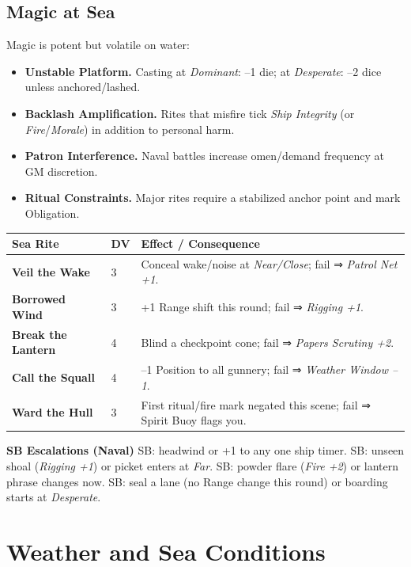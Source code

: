\documentclass[11pt,oneside]{book}
\begin{document}
\subsection*{Magic at Sea}
Magic is potent but volatile on water:
\begin{itemize}
  \item \textbf{Unstable Platform.} Casting at \emph{Dominant}: --1 die; at \emph{Desperate}: --2 dice unless anchored/lashed.
  \item \textbf{Backlash Amplification.} Rites that misfire tick \textit{Ship Integrity} (or \textit{Fire}/\textit{Morale}) in addition to personal harm.
  \item \textbf{Patron Interference.} Naval battles increase omen/demand frequency at GM discretion.
  \item \textbf{Ritual Constraints.} Major rites require a stabilized anchor point and mark Obligation.
\end{itemize}

\begin{tabularx}{\linewidth}{@{}p{3.1cm} p{1.7cm} X@{}}
\toprule
\textbf{Sea Rite} & \textbf{DV} & \textbf{Effect / Consequence}\\
\midrule
\textbf{Veil the Wake} & 3 & Conceal wake/noise at \emph{Near/Close}; fail ⇒ \textit{Patrol Net +1}.\\
\textbf{Borrowed Wind} & 3 & +1 Range shift this round; fail ⇒ \textit{Rigging +1}.\\
\textbf{Break the Lantern} & 4 & Blind a checkpoint cone; fail ⇒ \textit{Papers Scrutiny +2}.\\
\textbf{Call the Squall} & 4 & --1 Position to all gunnery; fail ⇒ \textit{Weather Window --1}.\\
\textbf{Ward the Hull} & 3 & First ritual/fire mark negated this scene; fail ⇒ Spirit Buoy flags you.\\
\bottomrule
\end{tabularx}

\begin{tcolorbox}[breakable]
\textbf{SB Escalations (Naval)} SB: headwind or +1 to any one ship timer. SB: unseen shoal (\textit{Rigging +1}) or picket enters at \emph{Far}. SB: powder flare (\textit{Fire +2}) or lantern phrase changes now. SB: seal a lane (no Range change this round) or boarding starts at \emph{Desperate}.
\end{tcolorbox}

\section{Weather and Sea Conditions}
\end{document}
